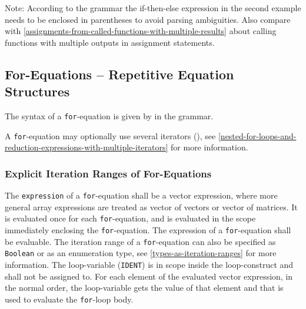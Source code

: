 \begin{nonnormative}
Note: According to the grammar the if-then-else expression in the second example needs to be enclosed in parentheses to avoid parsing ambiguities.
Also compare with \cref{assignments-from-called-functions-with-multiple-results} about calling functions with multiple outputs in assignment statements.
\end{nonnormative}


\subsection{For-Equations -- Repetitive Equation Structures}\label{for-equations-repetitive-equation-structures}

The syntax of a \lstinline!for!-equation is given by  in the grammar.

A \lstinline!for!-equation may optionally use several iterators (), see \cref{nested-for-loops-and-reduction-expressions-with-multiple-iterators} for more information.


\subsubsection{Explicit Iteration Ranges of For-Equations}\label{explicit-iteration-ranges-of-for-equations}

The \lstinline!expression! of a \lstinline!for!-equation shall be a vector expression, where more general array expressions are treated as vector of vectors or vector of matrices.
It is evaluated once for each \lstinline!for!-equation, and is evaluated in the scope immediately enclosing the \lstinline!for!-equation.
The expression of a \lstinline!for!-equation shall be evaluable.
The iteration range of a \lstinline!for!-equation can also be specified as \lstinline!Boolean! or as an enumeration type, see \cref{types-as-iteration-ranges} for more information.
The loop-variable (\lstinline!IDENT!) is in scope inside the loop-construct and shall not be assigned to.
For each element of the evaluated vector expression, in the normal order, the loop-variable gets the value of that element and that is used to evaluate the \lstinline!for!-loop body.

